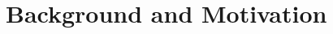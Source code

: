 \documentclass[conference]{IEEEtran}
\begin{document}
\vspace{-0.1cm}
\section{Background and Motivation}\label{Background and Motivation}
\vspace{-0.1cm}

\end{document}
